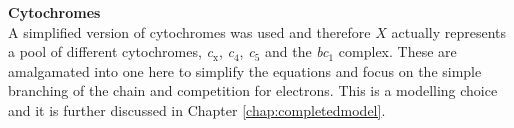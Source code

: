 {\bf Cytochromes}\\
A simplified version of cytochromes was used and therefore $X$ actually represents a pool of different cytochromes, \textit{c$_{\textrm{x}}$}, \textit{c$_{\textrm{4}}$}, \textit{c$_{\textrm{5}}$} and the \textit{bc$_{\textrm{1}}$} complex. These are amalgamated into one here to simplify the equations and focus on the simple branching of the chain and competition for electrons. This is a modelling choice and it is further discussed in Chapter \ref{chap:completedmodel}.

